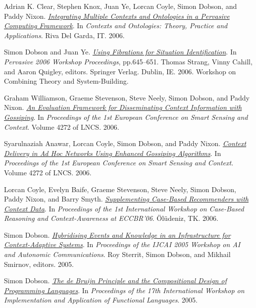 \documentclass[11pt]{article}
\begin{document}
\label{org3742ea1}Adrian K. Clear, Stephen Knox, Juan Ye, Lorcan Coyle, Simon Dobson, and Paddy Nixon.  \emph{\href{https://simondobson.org/softcopy/co-2006.pdf}{Integrating Multiple Contexts and Ontologies in a Pervasive Computing Framework}}. In \emph{Contexts and Ontologies: Theory, Practice and Applications}. Riva Del Garda, IT. 2006.

\label{org81f81f8}Simon Dobson and Juan Ye.  \emph{\href{https://simondobson.org/softcopy/tppc-06.pdf}{Using Fibrations for Situation Identification}}. In \emph{Pervasive 2006 Workshop Proceedings}, pp.645–651. Thomas Strang, Vinny Cahill, and Aaron Quigley, editors. Springer Verlag. Dublin, IE. 2006. Workshop on Combining Theory and System-Building.

\label{org6d02aa5}Graham Williamson, Graeme Stevenson, Steve Neely, Simon Dobson, and Paddy Nixon.  \emph{\href{https://simondobson.org/softcopy/eurossc-evaluation-06.pdf}{An Evaluation Framework for Disseminating Context Information with Gossiping}}. In \emph{Proceedings of the 1st European Conference on Smart Sensing and Context}. Volume 4272 of LNCS. 2006.

\label{org90e60f8}Syarulnaziah Anawar, Lorcan Coyle, Simon Dobson, and Paddy Nixon.  \emph{\href{https://simondobson.org/softcopy/eurossc-delivery-06.pdf}{Context Delivery in Ad Hoc Networks Using Enhanced Gossiping Algorithms}}. In \emph{Proceedings of the 1st European Conference on Smart Sensing and Context}. Volume 4272 of LNCS. 2006.

\label{org32929fd}Lorcan Coyle, Evelyn Baife, Graeme Stevenson, Steve Neely, Simon Dobson, Paddy Nixon, and Barry Smyth.  \emph{\href{https://simondobson.org/softcopy/eccbr-06.pdf}{Supplementing Case-Based Recommenders with Context Data}}. In \emph{Proceedings of the 1st International Workshop on Case-Based Reasoning and Context-Awareness at ECCBR’06}. Ölüdeniz, TK. 2006.

\label{org647bfde}Simon Dobson.  \emph{\href{https://simondobson.org/softcopy/ijcai-aiac-05b.pdf}{Hybridising Events and Knowledge in an Infrastructure for Context-Adaptive Systems}}. In \emph{Proceedings of the IJCAI 2005 Workshop on AI and Autonomic Communications}. Roy Sterrit, Simon Dobson, and Mikhail Smirnov, editors. 2005.

\label{orgfbc6041}Simon Dobson.  \emph{\href{https://simondobson.org/softcopy/de-bruijn-iafl-05.pdf}{The de Bruijn Principle and the Compositional Design of Programming Languages}}. In \emph{Proceedings of the 17th International Workshop on Implementation and Application of Functional Languages}. 2005.
\end{document}
